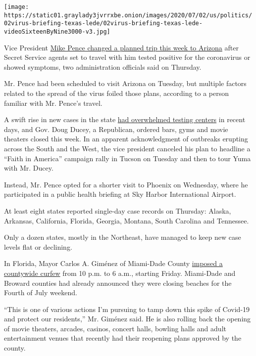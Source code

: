 \texttt{[image: https://static01.graylady3jvrrxbe.onion/images/2020/07/02/us/politics/02virus-briefing-texas-lede/02virus-briefing-texas-lede-videoSixteenByNine3000-v3.jpg]}

Vice President
\href{https://www.nytimes3xbfgragh.onion/2020/07/02/us/politics/pence-postponed-arizona-trip-virus.html}{Mike
Pence changed a planned trip this week to Arizona} after Secret Service
agents set to travel with him tested positive for the coronavirus or
showed symptoms, two administration officials said on Thursday.

Mr. Pence had been scheduled to visit Arizona on Tuesday, but multiple
factors related to the spread of the virus foiled those plans, according
to a person familiar with Mr. Pence's travel.

A swift rise in new cases in the state
\href{https://www.nytimes3xbfgragh.onion/2020/06/25/upshot/virus-testing-shortfall-arizona.html}{had
overwhelmed testing centers} in recent days, and Gov. Doug Ducey, a
Republican, ordered bars, gyms and movie theaters closed this week. In
an apparent acknowledgment of outbreaks erupting across the South and
the West, the vice president canceled his plan to headline a ``Faith in
America'' campaign rally in Tucson on Tuesday and then to tour Yuma with
Mr. Ducey.

Instead, Mr. Pence opted for a shorter visit to Phoenix on Wednesday,
where he participated in a public health briefing at Sky Harbor
International Airport.

At least eight states reported single-day case records on Thursday:
Alaska, Arkansas, California, Florida, Georgia, Montana, South Carolina
and Tennessee.

Only a dozen states, mostly in the Northeast, have managed to keep new
case levels flat or declining.

In Florida, Mayor Carlos A. Giménez of Miami-Dade County
\href{https://www.miamidade.gov/releases/2020-07-02-mayor-covid-measures.asp}{imposed
a countywide curfew} from 10 p.m. to 6 a.m., starting Friday. Miami-Dade
and Broward counties had already announced they were closing beaches for
the Fourth of July weekend.

``This is one of various actions I'm pursuing to tamp down this spike of
Covid-19 and protect our residents,'' Mr. Giménez said. He is also
rolling back the opening of movie theaters, arcades, casinos, concert
halls, bowling halls and adult entertainment venues that recently had
their reopening plans approved by the county.


